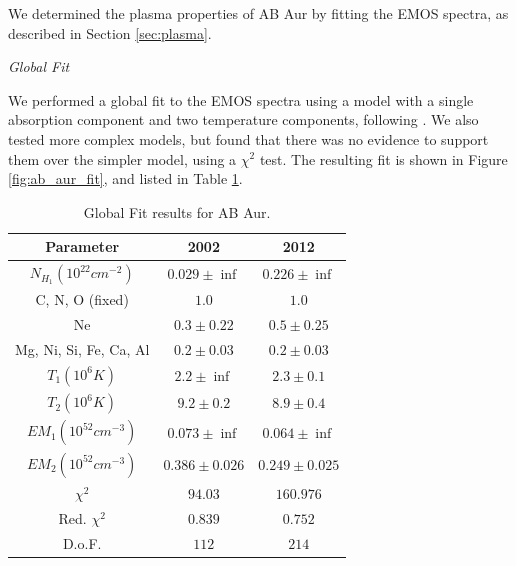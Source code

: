 \documentclass[twocolumn]{aastex631}
\begin{document}
We determined the plasma properties of AB Aur by fitting the EMOS spectra, as described in Section \ref{sec:plasma}.

\textit{Global Fit}

We performed a global fit to the EMOS spectra using a model with a single absorption component and two temperature components, following \citet{telleschi_first_2007}. We also tested more complex models, but found that there was no evidence to support them over the simpler model, using a $\chi^2$ test. The resulting fit is shown in Figure \ref{fig:ab_aur_fit}, and listed in Table \ref{table:ab_aur_fit}. 

\begin{table}
\begin{tabular}{|c|c|c|}
\hline
Parameter & 2002 & 2012 \\
\hline
$N_{H_1}(10^{22} cm^{-2})$  & $0.029 \pm \inf $     & $0.226 \pm \inf$  \\
C, N, O (fixed)             & $1.0$                 & $1.0$             \\
Ne                          & $0.3 \pm 0.22$        & $0.5 \pm 0.25$ \\
Mg, Ni, Si, Fe, Ca, Al      & $0.2 \pm 0.03$        & $0.2 \pm 0.03$   \\
$T_1 (10^6 K)$              & $2.2 \pm \inf$        & $2.3 \pm 0.1$    \\
$T_2 (10^6 K)$              & $9.2 \pm 0.2$         & $8.9 \pm 0.4$    \\
$EM_1 (10^{52} cm^{-3})$    & $0.073 \pm \inf $     & $0.064\pm\inf$    \\
$EM_2 (10^{52} cm^{-3})$    & $0.386 \pm 0.026$     & $0.249\pm0.025$   \\
\hline
$\chi^2$        & $94.03$ & $160.976$ \\
Red. $\chi^2$   & $0.839$ & $0.752$  \\
D.o.F.          & $112$   & $214$    \\
\hline
\end{tabular}
\label{table:ab_aur_fit}
\caption{Global Fit results for AB Aur.}
\end{table}
\end{document}
